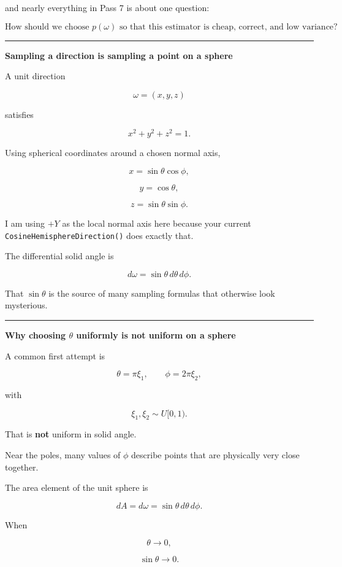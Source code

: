and nearly everything in Pass 7 is about one question:

\[
\boxed{
\text{How should we choose }p(\omega)\text{ so that this estimator is cheap, correct, and low variance?}
}
\]

\begin{center}\rule{0.5\linewidth}{0.5pt}\end{center}

\textbf{Sampling a direction is sampling a point on a sphere}

A unit direction

\[
\omega=(x,y,z)
\]

satisfies

\[
x^2+y^2+z^2=1.
\]

Using spherical coordinates around a chosen normal axis,

\[
x=\sin\theta\cos\phi,
\]

\[
y=\cos\theta,
\]

\[
z=\sin\theta\sin\phi.
\]

I am using \(+Y\) as the local normal axis here because your current \texttt{CosineHemisphereDirection()} does exactly that.

The differential solid angle is

\[
\boxed{
d\omega=\sin\theta\,d\theta\,d\phi.
}
\]

That \(\sin\theta\) is the source of many sampling formulas that otherwise look mysterious.

\begin{center}\rule{0.5\linewidth}{0.5pt}\end{center}

\textbf{Why choosing \(\theta\) uniformly is not uniform on a sphere}

A common first attempt is

\[
\theta=\pi\xi_1,
\qquad
\phi=2\pi\xi_2,
\]

with

\[
\xi_1,\xi_2\sim U[0,1).
\]

That is \textbf{not} uniform in solid angle.

Near the poles, many values of \(\phi\) describe points that are physically very close together.

The area element of the unit sphere is

\[
dA=d\omega
=
\sin\theta\,d\theta\,d\phi.
\]

When

\[
\theta\rightarrow0,
\]

\[
\sin\theta\rightarrow0.
\]

